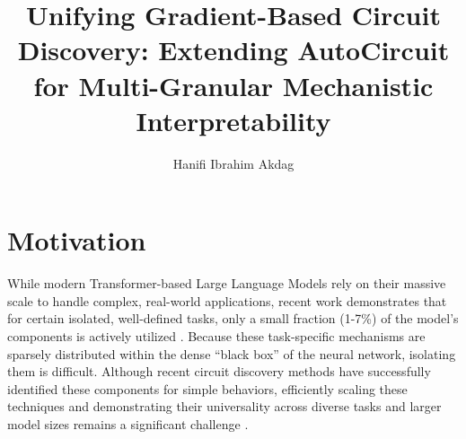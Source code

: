 \documentclass[
    IMRAD=false,
	english,
	ruledheaders=section, %
	class=report, %
	thesis={type=bachelor}, %
	accentcolor=9c, %
	custommargins=false,%
	marginpar=false,%
	parskip=half,%
	fontsize=11pt,%
]{tudapub}
\begin{document}


\newif\ifanonymize
\anonymizefalse %


\title{Unifying Gradient-Based Circuit Discovery: Extending AutoCircuit for Multi-Granular Mechanistic Interpretability}  %
\author{Hanifi Ibrahim Akdag}


\group{}

\submissiondate{\today}
\examdate{\today}


\maketitle

\chapter{Motivation}\label{motivation}

While modern Transformer-based Large Language Models \citep[LLMs;][]{gpt2, llama} rely on their massive scale to handle complex, real-world applications, recent work demonstrates that for certain isolated, well-defined tasks, only a small fraction (1-7\%) of the model's components is actively utilized \citep{yu-etal-2025-sheaf,wang2023interpretability,acdc}. Because these task-specific mechanisms are sparsely distributed within the dense ``black box'' of the neural network, isolating them is difficult. Although recent circuit discovery methods have successfully identified these components for simple behaviors, efficiently scaling these techniques and demonstrating their universality across diverse tasks and larger model sizes remains a significant challenge \citep{edgePruning, syed-etal-2024-attribution}.
\end{document}
